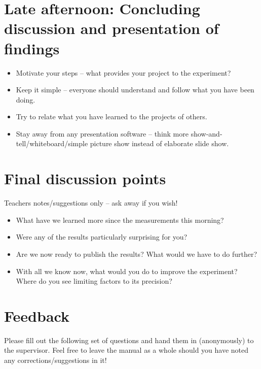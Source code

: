 \documentclass[a4,11pt, notitlepage]{article}
\begin{document}
\section{Late afternoon: Concluding discussion and presentation of findings}
\label{sec:final-presentation}

\begin{itemize}
\item Motivate your steps -- what provides your project to the experiment?
\item Keep it simple -- everyone should understand and follow what you
  have been doing.
\item Try to relate what you have learned to the projects of
  others.
\item Stay away from any presentation software -- think more
  show-and-tell/whiteboard/simple picture show instead of elaborate slide show.

\end{itemize}

\appendix

\section{Final discussion points}
\label{sec:further-discussion}

Teachers notes/suggestions only -- ask away if you wish!

\begin{itemize}
\item What have we learned more since the measurements this morning?
\item Were any of the results particularly surprising for you?
\item Are we now ready to publish the results? What would we have to
  do further?
\item With all we know now, what would you do to improve the
  experiment? Where do you see limiting factors to its precision?
\end{itemize}

\pagebreak
\section{Feedback}
\label{sec:feedback}

Please fill out the following set of questions and hand them in
(anonymously) to the supervisor. Feel free to leave the manual as a
whole should you have noted any corrections/suggestions in it!
\end{document}
